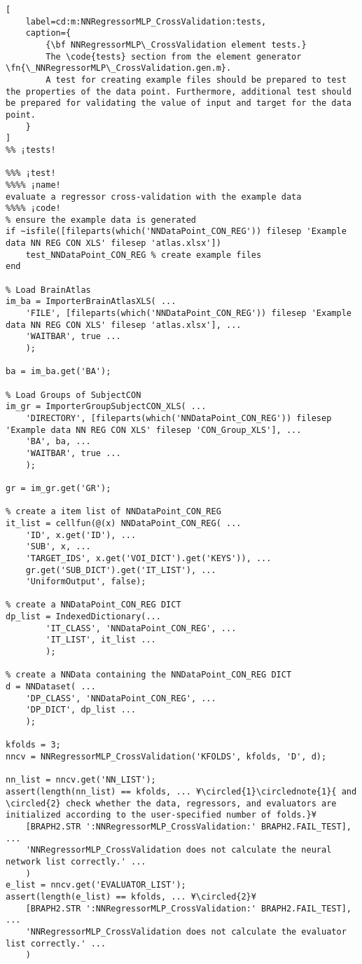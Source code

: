 \documentclass{tufte-handout}
\begin{document}
\begin{lstlisting}[
	label=cd:m:NNRegressorMLP_CrossValidation:tests,
	caption={
		{\bf NNRegressorMLP\_CrossValidation element tests.}
		The \code{tests} section from the element generator \fn{\_NNRegressorMLP\_CrossValidation.gen.m}.
		A test for creating example files should be prepared to test the properties of the data point. Furthermore, additional test should be prepared for validating the value of input and target for the data point.
	}
]			
%% ¡tests!

%%% ¡test!
%%%% ¡name!
evaluate a regressor cross-validation with the example data
%%%% ¡code!
% ensure the example data is generated
if ~isfile([fileparts(which('NNDataPoint_CON_REG')) filesep 'Example data NN REG CON XLS' filesep 'atlas.xlsx'])
    test_NNDataPoint_CON_REG % create example files
end

% Load BrainAtlas
im_ba = ImporterBrainAtlasXLS( ...
    'FILE', [fileparts(which('NNDataPoint_CON_REG')) filesep 'Example data NN REG CON XLS' filesep 'atlas.xlsx'], ...
    'WAITBAR', true ...
    );

ba = im_ba.get('BA');

% Load Groups of SubjectCON
im_gr = ImporterGroupSubjectCON_XLS( ...
    'DIRECTORY', [fileparts(which('NNDataPoint_CON_REG')) filesep 'Example data NN REG CON XLS' filesep 'CON_Group_XLS'], ...
    'BA', ba, ...
    'WAITBAR', true ...
    );

gr = im_gr.get('GR');

% create a item list of NNDataPoint_CON_REG
it_list = cellfun(@(x) NNDataPoint_CON_REG( ...
    'ID', x.get('ID'), ...
    'SUB', x, ...
    'TARGET_IDS', x.get('VOI_DICT').get('KEYS')), ...
    gr.get('SUB_DICT').get('IT_LIST'), ...
    'UniformOutput', false);

% create a NNDataPoint_CON_REG DICT
dp_list = IndexedDictionary(...
        'IT_CLASS', 'NNDataPoint_CON_REG', ...
        'IT_LIST', it_list ...
        );

% create a NNData containing the NNDataPoint_CON_REG DICT
d = NNDataset( ...
    'DP_CLASS', 'NNDataPoint_CON_REG', ...
    'DP_DICT', dp_list ...
    );

kfolds = 3;
nncv = NNRegressorMLP_CrossValidation('KFOLDS', kfolds, 'D', d);

nn_list = nncv.get('NN_LIST');
assert(length(nn_list) == kfolds, ... ¥\circled{1}\circlednote{1}{ and \circled{2} check whether the data, regressors, and evaluators are initialized according to the user-specified number of folds.}¥
    [BRAPH2.STR ':NNRegressorMLP_CrossValidation:' BRAPH2.FAIL_TEST], ...
    'NNRegressorMLP_CrossValidation does not calculate the neural network list correctly.' ...
    )
e_list = nncv.get('EVALUATOR_LIST');
assert(length(e_list) == kfolds, ... ¥\circled{2}¥
    [BRAPH2.STR ':NNRegressorMLP_CrossValidation:' BRAPH2.FAIL_TEST], ...
    'NNRegressorMLP_CrossValidation does not calculate the evaluator list correctly.' ...
    )

\end{lstlisting}
\end{document}
